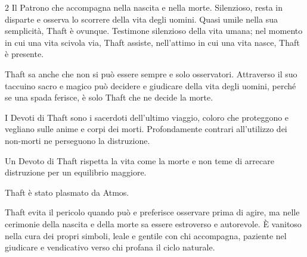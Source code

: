 \begin{multicols}{2}
Il Patrono che accompagna nella nascita e nella morte. Silenzioso, resta in disparte e osserva lo scorrere della vita degli uomini. Quasi umile nella sua semplicità, Thaft è ovunque. Testimone silenzioso della vita umana; nel momento in cui una vita scivola via, Thaft assiste, nell'attimo in cui una vita nasce, Thaft è presente.

Thaft sa anche che non si può essere sempre e solo osservatori. Attraverso il suo taccuino sacro e magico può decidere e giudicare della vita degli uomini, perché se una spada ferisce, è solo Thaft che ne decide la morte.

I Devoti di Thaft sono i sacerdoti dell'ultimo viaggio, coloro che proteggono e vegliano sulle anime e corpi dei morti. Profondamente contrari all'utilizzo dei non-morti ne perseguono la distruzione.

Un Devoto di Thaft rispetta la vita come la morte e non teme di arrecare distruzione per un equilibrio maggiore.

Thaft è stato plasmato da Atmos.

Thaft evita il pericolo quando può e preferisce osservare prima di agire, ma nelle cerimonie della nascita e della morte sa essere estroverso e autorevole. È vanitoso nella cura dei propri simboli, leale e gentile con chi accompagna, paziente nel giudicare e vendicativo verso chi profana il ciclo naturale.


\end{multicols}
